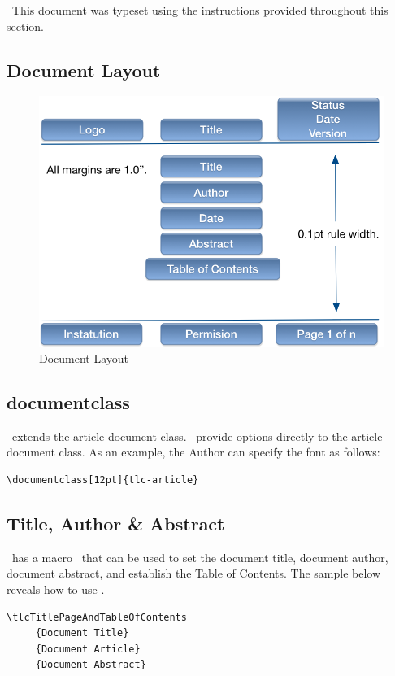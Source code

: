 \documentclass[12pt]{tlc-article}
\begin{document}
\tlcNote\ This document was typeset using the instructions provided throughout
this section.

\subsection{Document Layout}
\begin{figure}[h]
  \centering
  \includegraphics{images/titlepage.png}
  \caption{Document Layout}
  \label{fig:layout}
\end{figure}
\subsection{documentclass \tlcA}
\tlcA\ extends the article document class.  \tlcA\ provide options directly to
the article document class.  As an example, the Author can specify the font as
follows:

\begin{lstlisting}[basicstyle=\tiny]
  \documentclass[12pt]{tlc-article}
\end{lstlisting}

\subsection{Title, Author \& Abstract} \label{sec:TAA}
\tlcA\ has a macro \tlcTOC\ that can be used to set the document title, document
author, document abstract, and establish the Table of Contents.  The sample
below reveals how to use \tlcTOC.

\begin{lstlisting}[basicstyle=\tiny]
  \tlcTitlePageAndTableOfContents
     {Document Title}
     {Document Article}
     {Document Abstract}
\end{lstlisting}
\end{document}
